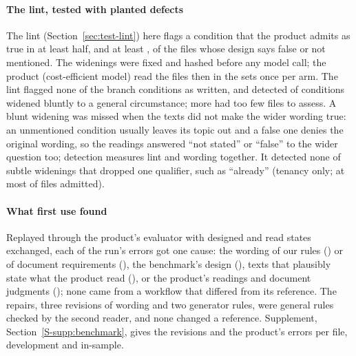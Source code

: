 \paragraph{The lint, tested with planted defects}
The lint (Section~\ref{sec:test-lint}) here flags a condition that the product admits as true in at least half, and at least \sfourdevLintMinFiles, of the files whose design says false or not mentioned. The widenings were fixed and hashed before any model call; the product (cost-efficient model) read the \sfourdevLintFiles{} files then in the sets once per arm. The lint flagged none of the \sfourdevLintUntouched{} branch conditions as written, and detected \sfourdevLintBluntDetected{} of \sfourdevLintBluntPlanted{} conditions widened bluntly to a general circumstance; \sfourdevLintBluntNotAssessable{} more had too few files to assess. A blunt widening was missed when the texts did not make the wider wording true: an unmentioned condition usually leaves its topic out and a false one denies the original wording, so the readings answered ``not stated'' or ``false'' to the wider question too; detection measures lint and wording together. It detected none of \sfourdevLintSubtlePlanted{} subtle widenings that dropped one qualifier, such as ``already'' (tenancy only; at most \sfourdevLintSubtleBestAdmitted{} of \sfourdevLintSubtleBestAssessed{} files admitted).

\paragraph{What first use found}
Replayed through the product's evaluator with designed and read states exchanged, each of the run's \sfourdevDiagAllErrors{} errors got one cause: the wording of our rules (\sfourdevDiagAllRuleWording) or of document requirements (\sfourdevDiagAllMustShow), the benchmark's design (\sfourdevDiagAllBenchmark), texts that plausibly state what the product read (\sfourdevDiagAllTextState), or the product's readings and document judgments (\sfourdevDiagAllProduct); none came from a workflow that differed from its reference. The repairs, three revisions of wording and two generator rules, were general rules checked by the second reader, and none changed a reference. Supplement, Section~\ref{S-supp:benchmark}, gives the revisions and the product's errors per file, development and in-sample.
